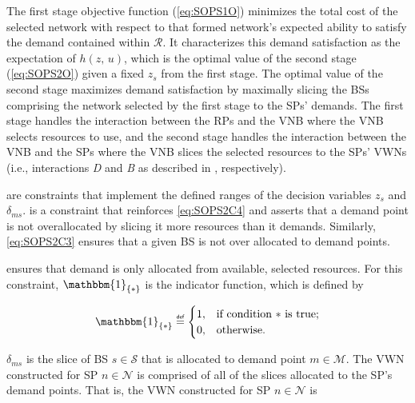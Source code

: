 \documentclass[12pt,dvipsnames]{report}
\newif\ifisdoublespacing
\newcommand\defeq{\mathrel{\overset{\makebox[0pt]{\mbox{\normalfont\tiny\sffamily def}}}{=}}}
\newcommand{\ind}[1]{\mathbbm{1}_{\left\{ #1 \right\}}}
\begin{document}
The first stage objective function (\cref{eq:SOPS1O}) minimizes the total cost of the selected network with respect to that formed network's expected ability to satisfy the demand contained within $\mathcal{R}$.  It characterizes this demand satisfaction as the expectation of $h\left( z,\, u \right)$, which is the optimal value of the second stage (\cref{eq:SOPS2O}) given a fixed $z_s$ from the first stage.  The optimal value of the second stage maximizes demand satisfaction by maximally slicing the BSs comprising the network selected by the first stage to the SPs' demands.  The first stage handles the interaction between the RPs and the VNB where the VNB selects resources to use, and the second stage handles the interaction between the VNB and the SPs where the VNB slices the selected resources to the SPs' VWNs (i.e., interactions \emph{D} and \emph{B} as described in , respectively).

 are constraints that implement the defined ranges of the decision variables $z_s$ and $\delta_{ms}$.   is a constraint that reinforces \cref{eq:SOPS2C4} and asserts that a demand point is not overallocated by slicing it more resources than it demands.  Similarly, \cref{eq:SOPS2C3} ensures that a given BS is not over allocated to demand points.

 ensures that demand is only allocated from available, selected resources.  For this constraint, $\ind{*}$ is the indicator function, which is defined by

\ifisdoublespacing
\begin{singlespacing}
\begin{equation} \label{eq:indicator}
\ind{*} \defeq
	\begin{cases}
		1,& \text{if condition $*$ is true;}\\
		\\
		0,& \text{otherwise}.
	\end{cases}
\end{equation}
\end{singlespacing}
\else
\begin{equation} \label{eq:indicator}
\ind{*} \defeq
	\begin{cases}
		1,& \text{if condition $*$ is true;}\\
		0,& \text{otherwise}.
	\end{cases}
\end{equation}
\fi

$\delta_{ms}$ is the slice of BS $s \in \mathcal{S}$ that is allocated to demand point $m \in \mathcal{M}$.  The VWN constructed for SP $n \in \mathcal{N}$ is comprised of all of the slices allocated to the SP's demand points.  That is, the VWN constructed for SP $n \in \mathcal{N}$ is 
\end{document}
